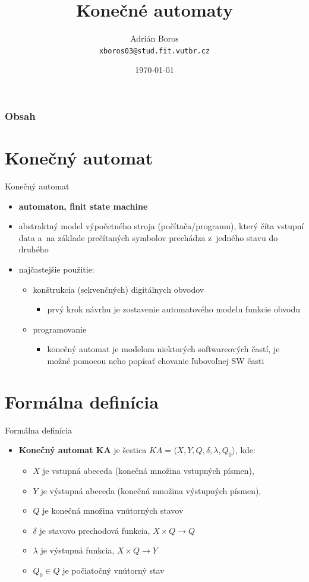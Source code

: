 \documentclass[hyperref={unicode}]{beamer}
\title{Konečné automaty}
\author[Adrián Boros]{Adrián Boros\texorpdfstring{\\ \texttt{xboros03@stud.fit.vutbr.cz}}{}}
\institute[VUT FIT]
{
	Vysoké učení technické v~Brne \\
	Fakulta informačních technológií
}
\date{\today}
\begin{document}
\begin{frame}
  \titlepage
\end{frame}

\begin{frame}
\transwipe
  \frametitle{Obsah}
  \tableofcontents
\end{frame}

\section{Konečný automat}
\begin{frame}{Konečný automat}
\transwipe
\begin{itemize}
\item {\textbf {\color{red} automaton, finit state machine}}
\item abstraktný model výpočetného stroja (počítača/programu), který číta vstupní data a~na základe prečítaných symbolov prechádza z~jedného stavu do druhého
\pause
\item najčastejšie použitie:
\begin{itemize}
\item [\textendash] konštrukcia (sekvenčných) digitálnych obvodov
\begin{itemize}
\item prvý krok návrhu je zostavenie automatového modelu funkcie obvodu
\end{itemize}
\item [\textendash] programovanie
\begin{itemize}
\item konečný automat je modelom niektorých softwareových častí, je možné pomocou neho popísať chovanie ľubovoľnej SW časti
\end{itemize}
\end{itemize}
\end{itemize}
\end{frame}

\section{Formálna definícia}
\begin{frame}{Formálna definícia}
\transwipe
\begin{itemize}
\item \textbf{Konečný automat KA} je šestica $KA = \langle X, Y, Q, \delta, \lambda, Q_0\rangle$, kde:
\begin{itemize}
\pause
\item ${X}$ je vstupná abeceda (konečná množina vstupných písmen),
\item ${Y}$ je výstupná abeceda (konečná množina výstupných písmen),
\item $Q$ je konečná množina vnútorných stavov
\item $\delta$ je stavovo prechodová funkcia, $X \times Q\longrightarrow Q$
\item $\lambda$ je výstupná funkcia, $X \times Q \longrightarrow Y$
\item $Q_0 \in Q$ je počiatočný vnútorný stav
\end{itemize}
\end{itemize}
\end{frame}
\end{document}
